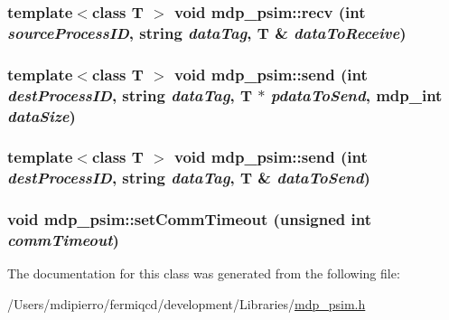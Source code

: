 \label{classmdp__psim_a1007797bc1b823b5f7f9bde424ed8765}
\hypertarget{classmdp__psim_a66099a8f714c4377ea4040a78b206983}{
\subsubsection[{recv}]{\setlength{\rightskip}{0pt plus 5cm}template$<$class T $>$ void mdp\_\-psim::recv (int {\em sourceProcessID}, \/  string {\em dataTag}, \/  T \& {\em dataToReceive})}}
\label{classmdp__psim_a66099a8f714c4377ea4040a78b206983}
\hypertarget{classmdp__psim_ad4f411191257a13fc36ef6ac40332638}{
\subsubsection[{send}]{\setlength{\rightskip}{0pt plus 5cm}template$<$class T $>$ void mdp\_\-psim::send (int {\em destProcessID}, \/  string {\em dataTag}, \/  T $\ast$ {\em pdataToSend}, \/  {\bf mdp\_\-int} {\em dataSize})}}
\label{classmdp__psim_ad4f411191257a13fc36ef6ac40332638}
\hypertarget{classmdp__psim_afe56014848f9405cc17cb772635e1aa5}{
\subsubsection[{send}]{\setlength{\rightskip}{0pt plus 5cm}template$<$class T $>$ void mdp\_\-psim::send (int {\em destProcessID}, \/  string {\em dataTag}, \/  T \& {\em dataToSend})}}
\label{classmdp__psim_afe56014848f9405cc17cb772635e1aa5}
\hypertarget{classmdp__psim_a1bbcfd250b4df9520ae4ff07fefe9204}{
\subsubsection[{setCommTimeout}]{\setlength{\rightskip}{0pt plus 5cm}void mdp\_\-psim::setCommTimeout (unsigned int {\em commTimeout})}}
\label{classmdp__psim_a1bbcfd250b4df9520ae4ff07fefe9204}


The documentation for this class was generated from the following file:\begin{DoxyCompactItemize}
\item 
/Users/mdipierro/fermiqcd/development/Libraries/\hyperlink{mdp__psim_8h}{mdp\_\-psim.h}\end{DoxyCompactItemize}
